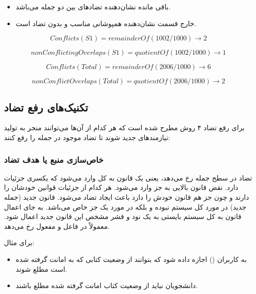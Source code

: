 \begin{itemize}
    \item باقی مانده نشان‌دهنده تضادهای بین دو جمله می‌باشد.
    \item خارج قسمت نشان‌دهنده همپوشانی مناسب و بدون تضاد است.
\end{itemize}

\begin{equation}
    Conflicts(S1) = remainderOf(1002/1000) \rightarrow 2
\end{equation}

\begin{equation}
    nonConflictingOverlaps(S1) = quotientOf(1002/1000) \rightarrow 1
\end{equation}

\begin{equation}
    Conflicts(Total) = remainderOf(2006/1000) \rightarrow 6
\end{equation}

\begin{equation}
    nonConflictOverlaps(Total) = quotientOf(2006/1000) \rightarrow 2
\end{equation}

\subsection{تکنیک‌های رفع تضاد}

برای رفع تضاد ۴ روش مطرح شده است که هر کدام از آن‌ها می‌توانند منجر به تولید
نیازمند‌های جدید شوند تا تضاد موجود در جمله را رفع کنند:

\subsubsection{خاص‌سازی منبع یا هدف تضاد}

تضاد در سطح جمله رخ می‌دهد، یعنی یک قانون به کل وارد می‌شود که یکسری جزئیات
دارد. نقض قانون بالایی به جز وارد می‌شود. هر کدام از جزئیات قوانین خودشان را
دارند و چون جز هم قانون خودش را دارد باعث ایجاد تضاد می‌شود. قانون جدید (جمله
جدید) در مورد کل سیستم نبوده و بلکه در مورد یک جز خاص می‌باشد. به جای اعمال
قانون به کل سیستم بایستی به یک نود و قشر مشخص این قانون جدید اعمال شود. معمولاً
در فاعل و مفعول رخ می‌دهد.

برای مثال:

\begin{itemize}
    \item به کاربران () اجازه داده شود که بتوانند از وضعیت کتابی که به
    امانت گرفته شده است مطلع شوند.
    \item دانشجویان نباید از وضعیت کتاب امانت گرفته شده مطلع باشند.
\end{itemize}

